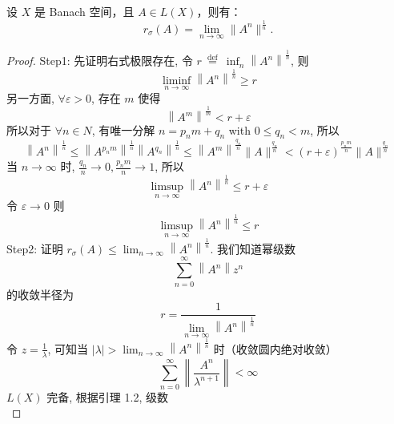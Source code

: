 \documentclass[lang=cn,newtx,10pt,scheme=chinese,thmcnt=chapter]{elegantbook}
\begin{document}
\begin{theorem}[Gelfand定理]
设 \( X \) 是 Banach 空间，且 \( A \in L(X) \)，则有：
\[
r_\sigma(A) = \lim_{n \to \infty} \|A^n\|^{\frac{1}{n}}.
\]
\end{theorem}
\begin{proof}
Step1: 先证明右式极限存在, 令 $r \stackrel{\text { def }}{=} \inf _n\left\|A^n\right\|^{\frac{1}{n}}$, 则
\begin{equation*}
\liminf _{n \rightarrow \infty}\left\|A^n\right\|^{\frac{1}{n}} \geqslant r
\end{equation*}
另一方面, $\forall \varepsilon>0$, 存在 $m$ 使得
\begin{equation*}
\left\|A^m\right\|^{\frac{1}{m}}<r+\varepsilon
\end{equation*}
所以对于 $\forall n \in N$, 有唯一分解 $n=p_n m+q_n$ with $0 \leqslant q_n<m$, 所以
\begin{equation*}
\left\|A^n\right\|^{\frac{1}{n}} \leqslant\left\|A^{p_n m}\right\|^{\frac{1}{n}}\left\|A^{q_n}\right\|^{\frac{1}{n}} \leqslant\left\|A^m\right\|^{\frac{q_n}{n}}\|A\|^{\frac{q_n}{n}}<(r+\varepsilon)^{\frac{p_n m}{n}}\|A\|^{\frac{q_n}{n}}
\end{equation*}
当 $n \rightarrow \infty$ 时, $\frac{q_n}{n} \rightarrow 0, \frac{p_n m}{n} \rightarrow 1$, 所以
\begin{equation*}
\limsup _{n \rightarrow \infty}\left\|A^n\right\|^{\frac{1}{n}} \leqslant r+\varepsilon
\end{equation*}
令 $\varepsilon \rightarrow 0$ 则
\begin{equation*}
\limsup _{n \rightarrow \infty}\left\|A^n\right\|^{\frac{1}{n}} \leqslant r
\end{equation*}
Step2: 证明 $r_\sigma(A) \leqslant \lim _{n \rightarrow \infty}\left\|A^n\right\|^{\frac{1}{n}}$. 我们知道幂级数
\begin{equation*}
\sum_{n=0}^{\infty}\left\|A^n\right\| z^n
\end{equation*}
的收敛半径为
\begin{equation*}
r=\frac{1}{\lim _{n \rightarrow \infty}\left\|A^n\right\|^{\frac{1}{n}}}
\end{equation*}
令 $z=\frac{1}{\lambda}$, 可知当 $|\lambda|>\lim _{n \rightarrow \infty}\left\|A^n\right\|^{\frac{1}{n}}$ 时（收敛圆内绝对收敛）
\begin{equation*}
\sum_{n=0}^{\infty}\left\|\frac{A^n}{\lambda^{n+1}}\right\|<\infty
\end{equation*}
$L (X)$ 完备, 根据引理 1.2, 级数
\begin{equation*}

\end{equation*}
\end{proof}
\end{document}
